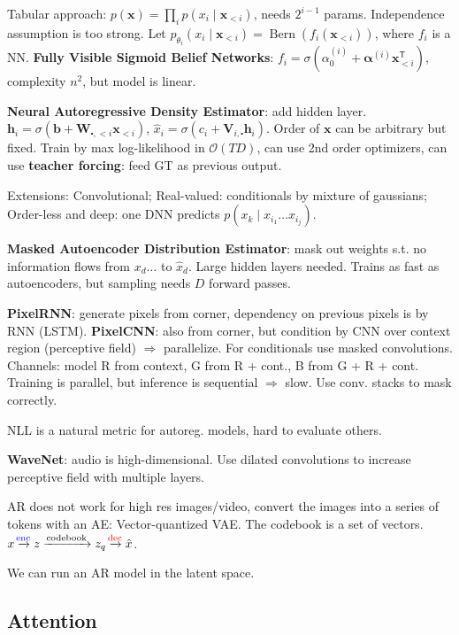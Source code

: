 \documentclass[11pt,landscape,a4paper,fleqn]{article}
\newcommand*{\tran}{^{\mathsf{T}}} %
\def\myvector#1{\mathbf{#1}}
\def\vb{{\myvector{b}}}
\def\vh{{\myvector{h}}}
\def\vx{{\myvector{x}}}
\def\mymatrix#1{\mathbf{#1}}
\def\mV{{\mymatrix{V}}}
\def\mW{{\mymatrix{W}}}
\begin{document}
\begin{multicols*}{4}
Tabular approach: $p(\vx) = \prod_i p(x_i \mid \vx_{<i})$, needs $2^{i - 1}$ params.
Independence assumption is too strong.
Let $p_{\theta_i}(x_i \mid \vx_{ < i}) = \operatorname{Bern}(f_i(\vx_{ < i}))$,
where $f_i$ is a NN.
\textbf{Fully Visible Sigmoid Belief Networks}: $f_i = \sigma(\alpha^{(i)}_0 + \bm{\alpha}^{(i)} \vx_{ < i}\tran)$,
complexity $n^2$, but model is linear.

\textbf{Neural Autoregressive Density Estimator}: add hidden layer.
$\vh_i = \sigma(\vb + \mW_{\centerdot, < i} \vx_{ < i})$,
$\hat{x}_i = \sigma(c_i + \mV_{i,\centerdot} \vh_i)$.
Order of $\vx$ can be arbitrary but fixed.
Train by max log-likelihood in $\mathcal{O}(TD)$, can use 2nd order optimizers,
can use \textbf{teacher forcing}: feed GT as previous output.

Extensions: Convolutional; Real-valued: conditionals by mixture of gaussians;
Order-less and deep: one DNN predicts $p(x_k \mid x_{i_1} \dots x_{i_j})$.

\textbf{Masked Autoencoder Distribution Estimator}:
mask out weights s.t. no information flows from $x_d \dots $ to $\hat{x}_d$.
Large hidden layers needed.
Trains as fast as autoencoders, but sampling needs $D$ forward passes.

\textbf{PixelRNN}: generate pixels from corner, dependency on previous pixels is by RNN (LSTM).
\textbf{PixelCNN}: also from corner, but condition by CNN over context region (perceptive field) $ \Rightarrow $ parallelize.
For conditionals use masked convolutions.
Channels: model R from context, G from R + cont., B from G + R + cont.
Training is parallel, but inference is sequential $ \Rightarrow $ slow.
Use conv. stacks to mask correctly.

NLL is a natural metric for autoreg. models,
hard to evaluate others.

\textbf{WaveNet}: audio is high-dimensional.
Use dilated convolutions to increase perceptive field with multiple layers.

AR does not work for high res images/video, convert the images into a series of tokens with an AE:
Vector-quantized VAE.
The codebook is a set of vectors.
$x \xrightarrow{\mathrm{\makebox[0pt]{\scriptsize \textcolor{blue}{enc}}}} z \xrightarrow{\mathrm{codebook}} z_q \xrightarrow{\mathrm{\makebox[0pt]{\scriptsize \textcolor{red}{dec}}}} \hat{x}$.

We can run an AR model in the latent space.

\subsection{Attention}


\end{multicols*}
\end{document}
